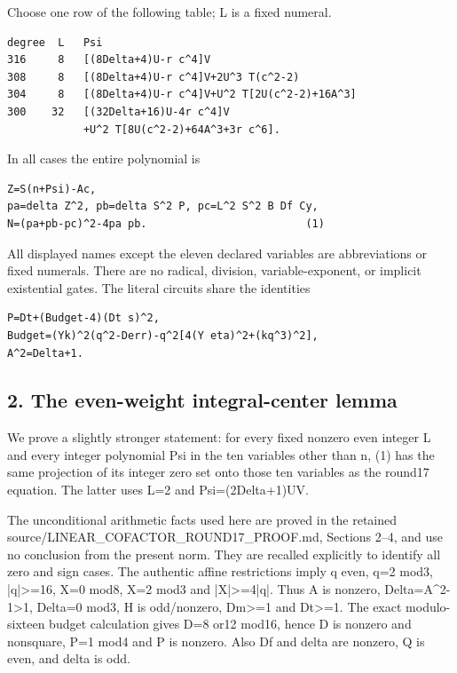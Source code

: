 Choose one row of the following table; L is a fixed numeral.

\begingroup\small
\begin{verbatim}
degree  L   Psi
316     8   [(8Delta+4)U-r c^4]V
308     8   [(8Delta+4)U-r c^4]V+2U^3 T(c^2-2)
304     8   [(8Delta+4)U-r c^4]V+U^2 T[2U(c^2-2)+16A^3]
300    32   [(32Delta+16)U-4r c^4]V
            +U^2 T[8U(c^2-2)+64A^3+3r c^6].
\end{verbatim}
\endgroup

In all cases the entire polynomial is

\begingroup\small
\begin{verbatim}
Z=S(n+Psi)-Ac,
pa=delta Z^2, pb=delta S^2 P, pc=L^2 S^2 B Df Cy,
N=(pa+pb-pc)^2-4pa pb.                         (1)
\end{verbatim}
\endgroup

All displayed names except the eleven declared variables are abbreviations or
fixed numerals. There are no radical, division, variable-exponent, or implicit
existential gates. The literal circuits share the identities

\begingroup\small
\begin{verbatim}
P=Dt+(Budget-4)(Dt s)^2,
Budget=(Yk)^2(q^2-Derr)-q^2[4(Y eta)^2+(kq^3)^2],
A^2=Delta+1.
\end{verbatim}
\endgroup

\subsection{2. The even-weight integral-center lemma}

We prove a slightly stronger statement: for every fixed nonzero even integer L
and every integer polynomial Psi in the ten variables other than n, (1) has the
same projection of its integer zero set onto those ten variables as the
round17 equation. The latter uses L=2 and Psi=(2Delta+1)UV.

The unconditional arithmetic facts used here are proved in the retained
source/LINEAR\_COFACTOR\_ROUND17\_PROOF.md, Sections 2--4, and use no conclusion
from the present norm. They are recalled explicitly to identify all zero and
sign cases. The authentic affine restrictions imply q even, q=2 mod3,
|q|>=16, X=0 mod8, X=2 mod3 and |X|>=4|q|. Thus A is nonzero,
Delta=A\textasciicircum{}2-1>1, Delta=0 mod3, H is odd/nonzero, Dm>=1 and Dt>=1.
The exact modulo-sixteen budget calculation gives D=8 or12 mod16, hence
D is nonzero and nonsquare, P=1 mod4 and P is nonzero. Also Df and delta
are nonzero, Q is even, and delta is odd.

